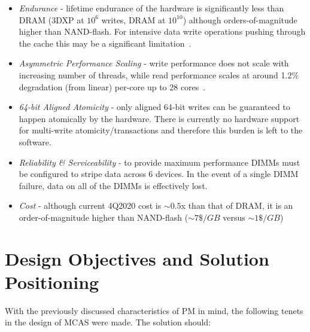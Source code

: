 \documentclass[letterpaper,twocolumn,10pt]{article}
\newcommand{\pmem}{PM\xspace}
\begin{document}
\begin{itemize}

\item \textit{Endurance} - lifetime endurance of the hardware is
  significantly less than DRAM (3DXP at $10^6$ writes, DRAM at $10^{10}$)
  although orders-of-magnitude higher than NAND-flash. For intensive
  data write operations pushing through the cache this may be a
  significant limitation~\cite{227810}.

\item \textit{Asymmetric Performance Scaling} - write performance does
  not scale with increasing number of threads, while read performance
  scales at around 1.2\% degradation (from linear) per-core up to 28
  cores~\cite{9238605}.

\item \textit{64-bit Aligned Atomicity} - only aligned 64-bit writes
  can be guaranteed to happen atomically by the hardware.  There is
  currently no hardware support for multi-write atomicity/transactions and
  therefore this burden is left to the software.

\item \textit{Reliability \& Serviceability} - to provide maximum
  performance DIMMs must be configured to stripe data across 6
  devices.  In the event of a single DIMM failure, data on all of the
  DIMMs is effectively lost.
  
\item \textit{Cost} - although current 4Q2020 cost is $\sim0.5$x than
  that of DRAM, it is an order-of-magnitude higher than NAND-flash
  ($\sim 7\$/GB$ versus $\sim 1\$/GB$)

\end{itemize}

\section{Design Objectives and Solution Positioning}

With the previously discussed characteristics of \pmem in mind, the following
tenets in the design of MCAS were made.  The solution should:
\end{document}
